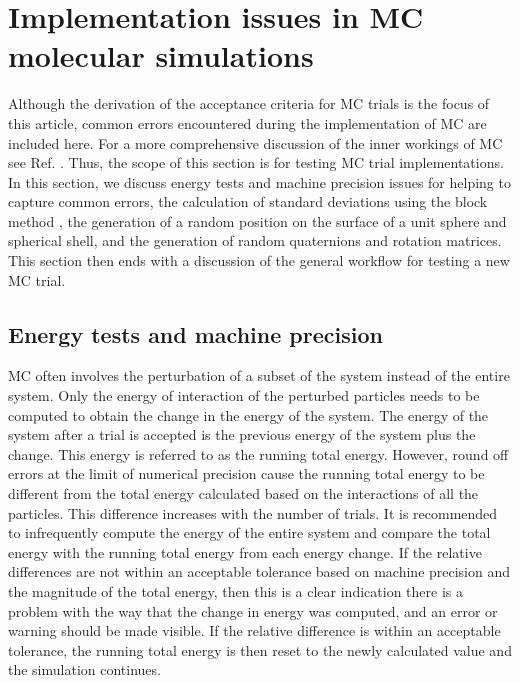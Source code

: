 \documentclass[
  9pt,
  bestpractices,
]{livecoms}
\begin{document}
\section{\label{sec:common_issues}Implementation issues in MC molecular simulations}

Although the derivation of the acceptance criteria for MC trials is the focus of this article, common errors encountered during the implementation of MC are included here.
For a more comprehensive discussion of the inner workings of MC see Ref. \cite{dubbeldam_inner_2013}.
Thus, the scope of this section is for testing MC trial implementations.
In this section, we discuss energy tests and machine precision issues for helping to capture common errors, the calculation of standard deviations using the block method \cite{flyvbjerg_error_1989, grossfield_best_2018}, the generation of a random position on the surface of a unit sphere and spherical shell, and the generation of random quaternions and rotation matrices.
This section then ends with a discussion of the general workflow for testing a new MC trial.

\subsection{\label{sec:energy_test}Energy tests and machine precision}

MC often involves the perturbation of a subset of the system instead of the entire system.
Only the energy of interaction of the perturbed particles needs to be computed to obtain the change in the energy of the system.
The energy of the system after a trial is accepted is the previous energy of the system plus the change.
This energy is referred to as the running total energy.
However, round off errors at the limit of numerical precision cause the running total energy to be different from the total energy calculated based on the interactions of all the particles.
This difference increases with the number of trials.
It is recommended to infrequently compute the energy of the entire system and compare the total energy with the running total energy from each energy change.
If the relative differences are not within an acceptable tolerance based on machine precision and the magnitude of the total energy, then this is a clear indication there is a problem with the way that the change in energy was computed, and an error or warning should be made visible.
If the relative difference is within an acceptable tolerance, the running total energy is then reset to the newly calculated value and the simulation continues.
\end{document}
